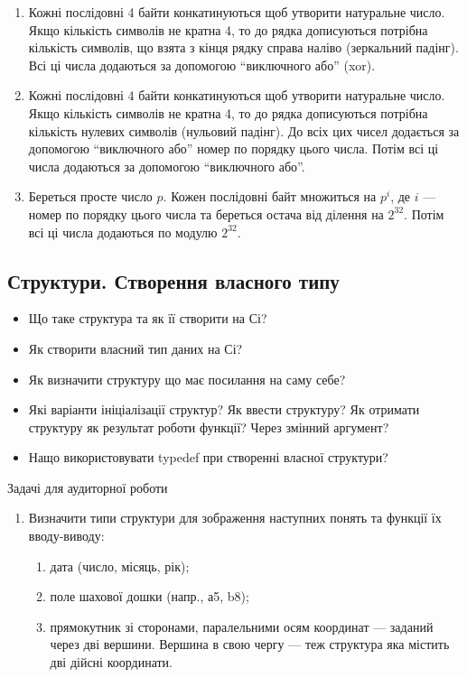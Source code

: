 \documentclass[]{article}
\makeatletter
\newcommand{\xslalph}[1]{\expandafter\@xslalph\csname c@#1\endcsname}
\newcommand{\@xslalph}[1]{%
    \ifcase#1\or а\or б\or в\or г\or д\or e\or є\or ж\or з\or i%
    \or й\or к\or л\or м\or н\or о\or п\or р\or с\or т%
    \or у\or ф\or х\or ц\or ч\or ш\or ю\or я\or аа\or бб\or вв%
    \else\@ctrerr\fi%
}
\makeatother
\begin{document}
\begin{enumerate}
\begin{enumerate}[label=\xslalph*)]
\begin{enumerate}
\begin{enumerate}[label=\xslalph*)]
\begin{enumerate}[label=\xslalph*)]
\item Кожні послідовні 4 байти конкатинуються щоб утворити натуральне
число. Якщо кількість символів не кратна 4, то до рядка дописуються
потрібна кількість символів, що взята з кінця рядку справа наліво
(зеркальний падінг). Всі ці числа додаються за допомогою ``виключного
або'' (xor).
\item Кожні послідовні 4 байти конкатинуються щоб утворити натуральне
число. Якщо кількість символів не кратна 4, то до рядка дописуються
потрібна кількість нулевих символів (нульовий падінг). До всіх цих чисел
додається за допомогою ``виключного або'' номер по порядку цього числа.
Потім всі ці числа додаються за допомогою ``виключного або''.
\item Береться просте число $p$. Кожен послідовні байт множиться на $p^{i}$,
 де $i$ --- номер по порядку цього числа та береться
остача від ділення на $2^{32}$. Потім всі ці числа додаються по модулю $2^{32}$.
\end{enumerate}

\newpage
\subsection{Структури. Створення власного типу}
\setcounter{subsection}{1}

\begin{itemize}
\item Що таке структура та як її створити на Сі?
\item Як створити власний тип даних на Сі?
\item Як визначити структуру що має посилання на саму себе?
\item Які варіанти ініціалізації структур? Як ввести структуру? Як отримати
структуру як результат роботи функції? Через змінний аргумент?
\item Нащо використовувати typedef при створенні власної структури?
\end{itemize}

Задачі для аудиторної роботи

\begin{enumerate}
\def\labelenumi{\arabic{enumi})}
\item
  Визначити типи структури для зображення наступних понять та функції їх вводу-виводу:
 \begin{enumerate}[label=\xslalph*)]
 \item дата (число, місяць, рік);
 \item поле шахової дошки (напр., а5, b8);
 \item прямокутник зі сторонами, паралельними осям координат --- заданий через дві вершини.
Вершина в свою чергу --- теж структура яка містить дві дійсні координати.
 \end{enumerate}


\end{enumerate}
\end{enumerate}
\end{enumerate}
\end{enumerate}
\end{enumerate}
\end{document}
